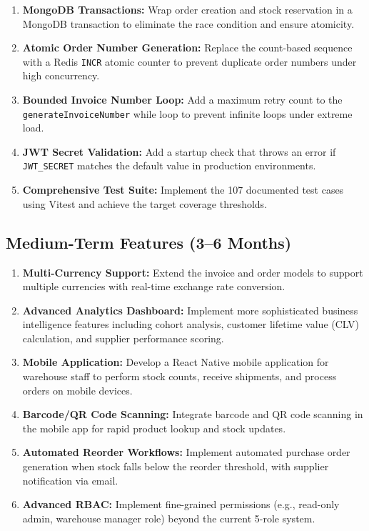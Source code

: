 \documentclass[12pt,a4paper]{report}
\begin{document}
\begin{tcolorbox}[warningbox,title={Priority Improvements}]
\begin{enumerate}[leftmargin=1.5em]
  \item \textbf{MongoDB Transactions:} Wrap order creation and stock reservation in a MongoDB transaction to eliminate the race condition and ensure atomicity.
  \item \textbf{Atomic Order Number Generation:} Replace the count-based sequence with a Redis \texttt{INCR} atomic counter to prevent duplicate order numbers under high concurrency.
  \item \textbf{Bounded Invoice Number Loop:} Add a maximum retry count to the \texttt{generateInvoiceNumber} while loop to prevent infinite loops under extreme load.
  \item \textbf{JWT Secret Validation:} Add a startup check that throws an error if \texttt{JWT\_SECRET} matches the default value in production environments.
  \item \textbf{Comprehensive Test Suite:} Implement the 107 documented test cases using Vitest and achieve the target coverage thresholds.
\end{enumerate}
\end{tcolorbox}

\subsection{Medium-Term Features (3--6 Months)}

\begin{enumerate}[leftmargin=1.5em]
  \item \textbf{Multi-Currency Support:} Extend the invoice and order models to support multiple currencies with real-time exchange rate conversion.
  \item \textbf{Advanced Analytics Dashboard:} Implement more sophisticated business intelligence features including cohort analysis, customer lifetime value (CLV) calculation, and supplier performance scoring.
  \item \textbf{Mobile Application:} Develop a React Native mobile application for warehouse staff to perform stock counts, receive shipments, and process orders on mobile devices.
  \item \textbf{Barcode/QR Code Scanning:} Integrate barcode and QR code scanning in the mobile app for rapid product lookup and stock updates.
  \item \textbf{Automated Reorder Workflows:} Implement automated purchase order generation when stock falls below the reorder threshold, with supplier notification via email.
  \item \textbf{Advanced RBAC:} Implement fine-grained permissions (e.g., read-only admin, warehouse manager role) beyond the current 5-role system.
\end{enumerate}
\end{document}
